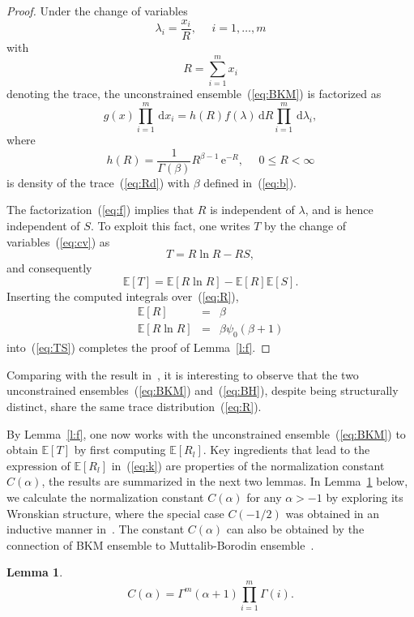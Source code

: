 \documentclass[pdflatex,sn-mathphys-num]{sn-jnl}%
\theoremstyle{thmstyleone}
\newtheorem{lemma}{Lemma}
\newcommand{\dd}{\,\mathrm{d}}
\newcommand{\ee}{\,\mathrm{e}}
\begin{document}
\begin{proof}
Under the change of variables
\begin{equation}\label{eq:cv}
\lambda_i=\frac{x_i}{R},~~~~~~i=1,\dots,m
\end{equation}
with
\begin{equation}\label{eq:Rd}
R=\sum_{i=1}^{m}x_i
\end{equation}
denoting the trace, the unconstrained ensemble~(\ref{eq:BKM}) is factorized as
\begin{equation}\label{eq:f}
g(x)\prod_{i=1}^{m}\dd x_i=h(R)f(\lambda)\dd R\prod_{i=1}^m\dd\lambda_i,
\end{equation}
where
\begin{equation}\label{eq:R}
h(R)=\frac{1}{\Gamma(\beta)}R^{\beta-1}\ee^{-R},~~~~~~0\leq R<\infty
\end{equation}
is density of the trace~(\ref{eq:Rd}) with $\beta$ defined in~(\ref{eq:b}).

The factorization~(\ref{eq:f}) implies that $R$ is independent of $\lambda$, and is hence independent of $S$. To exploit this fact, one writes $T$ by the change of variables~(\ref{eq:cv}) as
\begin{equation}
T=R\ln R-RS,
\end{equation}
and consequently
\begin{equation}\label{eq:TS}
\mathbb{E}[T]=\mathbb{E}[R\ln R]-\mathbb{E}[R]\mathbb{E}[S].
\end{equation}
Inserting the computed integrals over~(\ref{eq:R}),
\begin{eqnarray}
\mathbb{E}[R] &=& \beta \\
\mathbb{E}[R\ln R] &=& \beta\psi_{0}(\beta+1) \label{eq:RT}
\end{eqnarray}
into~(\ref{eq:TS}) completes the proof of Lemma~\ref{l:f}.
\end{proof}

Comparing with the result in~\cite[Eq.(23)]{Wei20BH}, it is interesting to observe that the two unconstrained ensembles~(\ref{eq:BKM}) and~(\ref{eq:BH}), despite being structurally distinct, share the same trace distribution~(\ref{eq:R}).

By Lemma~\ref{l:f}, one now works with the unconstrained ensemble~(\ref{eq:BKM}) to obtain $\mathbb{E}[T]$ by first computing $\mathbb{E}\left[R_{l}\right]$. Key ingredients that lead to the expression of $\mathbb{E}\left[R_{l}\right]$ in~(\ref{eq:k}) are properties of the normalization constant $C(\alpha)$,
the results are summarized in the next two lemmas. In Lemma~\ref{l:C} below, we calculate the normalization constant $C(\alpha)$ for any $\alpha>-1$ by exploring its Wronskian structure, where the special case $C(-1/2)$ was obtained in an inductive manner in~\cite{Miller25}. The constant $C(\alpha)$ can also be obtained by the connection of BKM ensemble to Muttalib-Borodin ensemble~\cite{Forrester17,Cheliotis18}.
\begin{lemma}\label{l:C}
\begin{equation}\label{eq:lC}
C(\alpha)=\Gamma^{m}(\alpha+1)\prod_{i=1}^{m}\Gamma(i).
\end{equation}
\end{lemma}
\end{document}
